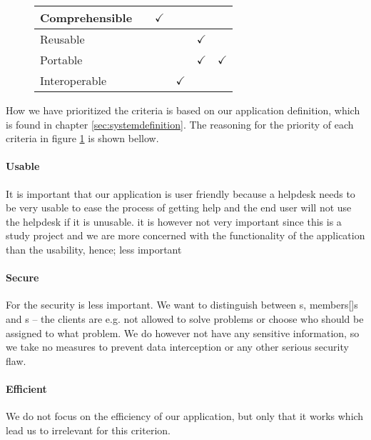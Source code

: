 \begin{figure}[h]
\begin{tabular}{| l | m{} | m{}| m{}| m{}|m{}|}
		Comprehensible  		& 																				& \multicolumn{1}{c|}{$\checkmark$} 		& 																		& 																	& 																	\\ \hline
		Reusable  					& 																				& 																			& 																		& \multicolumn{1}{c|}{$\checkmark$} & 																	\\ \hline
		Portable 						& 																				& 																			& 																		& \multicolumn{1}{c|}{$\checkmark$} &	\multicolumn{1}{c|}{$\checkmark$} \\ \hline
		Interoperable 			& 																				& 																			& \multicolumn{1}{c|}{$\checkmark$} 	& 																	& 																	\\ \hline
		\end{tabular}
	\label{fig:prioritizedCrit}
\end{figure}

How we have prioritized the criteria is based on our application definition, which is found in chapter \ref{sec:systemdefinition}. The reasoning for the priority of each criteria in figure \ref{fig:prioritizedCrit} is shown bellow.

\paragraph{Usable}

It is important that our application is user friendly because a helpdesk needs to be very usable to ease the process of getting help and the end user will not use the helpdesk if it is unusable.
it is however not very important since this is a study project and we are more concerned with the functionality of the application than the usability, hence; less important 
\paragraph{Secure}
For the \hdesk[] security is less important. We want to distinguish between \aclient[]s, \astaff members[]s and \admin[]s -- the clients are e.g. not allowed to solve problems or choose who should be assigned to what problem.
We do however not have any sensitive information, so we take no measures to prevent data interception or any other serious security flaw.
\paragraph{Efficient}
We do not focus on the efficiency of our application, but only that it works which lead us to irrelevant for this criterion.
